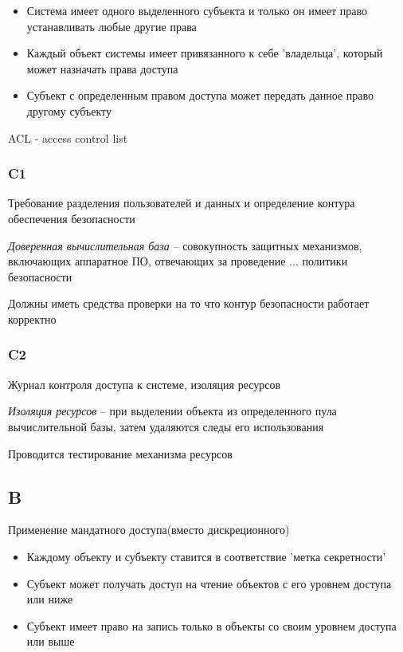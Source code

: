 \documentclass[12pt, a4paper]{article}
\begin{document}
\begin{itemize}
    \item Система имеет одного выделенного субъекта и только он имеет право устанавливать любые другие права
    
    \item Каждый объект системы имеет привязанного к себе 'владельца', который может назначать права доступа
    
    \item Субъект с определенным правом доступа может передать данное право другому субъекту
\end{itemize}

ACL - access control list


\subsubsection{C1}
Требование разделения пользователей и данных и определение контура обеспечения безопасности

\emph{Доверенная вычислительная база} -- совокупность защитных механизмов, включающих аппаратное ПО, отвечающих за проведение ... политики безопасности

Должны иметь средства проверки на то что контур безопасности работает корректно

\subsubsection{C2}
Журнал контроля доступа к системе, изоляция ресурсов

\emph{Изоляция ресурсов} -- при выделении объекта из определенного пула вычислительной базы, затем удаляются следы его использования

Проводится тестирование механизма ресурсов


\subsection{B}

Применение мандатного доступа(вместо дискреционного)
\begin{itemize}
    \item Каждому объекту и субъекту ставится в соответствие 'метка секретности'

    \item Субъект может получать доступ на чтение объектов с его уровнем доступа или ниже

    \item Субъект имеет право на запись только в объекты со своим уровнем доступа или выше
\end{itemize}
\end{document}
